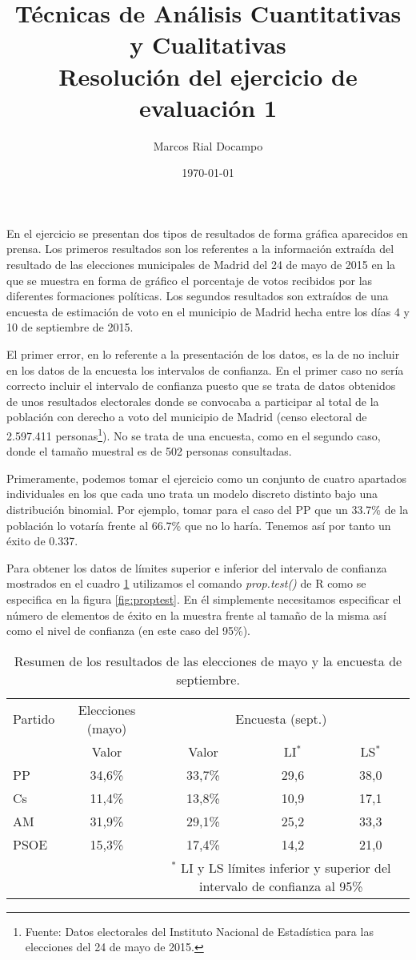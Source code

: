 \documentclass[11pt,a4paper]{article}
\author{Marcos Rial Docampo}
\title{Técnicas de Análisis Cuantitativas y Cualitativas\\Resolución del ejercicio de evaluación 1}
\date{\small{\today}}
\begin{document}
\maketitle

En el ejercicio se presentan dos tipos de resultados de forma gráfica aparecidos en prensa. Los primeros resultados son los referentes a la información extraída del resultado de las elecciones municipales de Madrid del 24 de mayo de 2015 en la que se muestra en forma de gráfico el porcentaje de votos recibidos por las diferentes formaciones políticas. Los segundos resultados son extraídos de una encuesta de estimación de voto en el municipio de Madrid hecha entre los días 4 y 10 de septiembre de 2015.

El primer error, en lo referente a la presentación de los datos, es la de no incluir en los datos de la encuesta los intervalos de confianza. En el primer caso no sería correcto incluir el intervalo de confianza puesto que se trata de datos obtenidos de unos resultados electorales donde se convocaba a participar al total de la población con derecho a voto del municipio de Madrid (censo electoral de 2.597.411 personas\footnote{Fuente: Datos electorales del Instituto Nacional de Estadística para las elecciones del 24 de mayo de 2015.}). No se trata de una encuesta, como en el segundo caso, donde el tamaño muestral es de 502 personas consultadas.

Primeramente, podemos tomar el ejercicio como un conjunto de cuatro apartados individuales en los que cada uno trata un modelo discreto distinto bajo una distribución binomial. Por ejemplo, tomar para el caso del PP que un 33.7\% de la población lo votaría frente al 66.7\% que no lo haría. Tenemos así por tanto un éxito de 0.337.

Para obtener los datos de límites superior e inferior del intervalo de confianza mostrados en el cuadro \ref{tab:resumen} utilizamos el comando \textit{prop.test()} de R como se especifica en la figura \ref{fig:proptest}. En él simplemente necesitamos especificar el número de elementos de éxito en la muestra frente al tamaño de la misma así como el nivel de confianza (en este caso del 95\%).

\begin{table}
	\centering
	\begin{tabular}{lcccc}
	\toprule[0.4mm]
	Partido & Elecciones (mayo) & \multicolumn{3}{c}{Encuesta (sept.)}\\
	& Valor & Valor & LI$^{*}$ & LS$^{*}$ \\
	\midrule
	PP & 34,6\% & 33,7\% & 29,6 & 38,0 \\
	Cs & 11,4\% & 13,8\% & 10,9 & 17,1 \\
	AM & 31,9\% & 29,1\% & 25,2 & 33,3 \\
	PSOE & 15,3\% & 17,4\% & 14,2 & 21,0 \\
	\bottomrule[0.4mm]
	& & \multicolumn{3}{p{3.4cm}}{\footnotesize{$^{*}$ LI y LS límites inferior y superior del intervalo de confianza al 95\%}}
	\end{tabular}
	\caption{Resumen de los resultados de las elecciones de mayo y la encuesta de septiembre.}
\label{tab:resumen}
\end{table}
\end{document}
